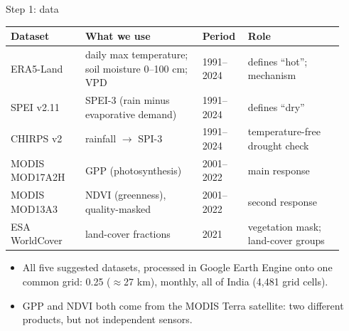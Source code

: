 \documentclass[11pt,aspectratio=169]{beamer}
\begin{document}
\begin{frame}{Step 1: data}
  \scriptsize
  \renewcommand{\arraystretch}{0.95}
  \begin{tabular}{@{}L{0.21\linewidth}L{0.33\linewidth}L{0.12\linewidth}L{0.27\linewidth}@{}}
    \toprule
    \textbf{Dataset} & \textbf{What we use} & \textbf{Period} & \textbf{Role} \\
    \midrule
    ERA5-Land \citep{munozsabater2021} & daily max temperature; soil moisture 0--100 cm; VPD & 1991--2024 & defines ``hot''; mechanism \\
    SPEI v2.11 \citep{vicenteserrano2010} & SPEI-3 (rain minus evaporative demand) & 1991--2024 & defines ``dry'' \\
    CHIRPS v2 \citep{funk2015} & rainfall $\rightarrow$ SPI-3 & 1991--2024 & temperature-free drought check \\
    MODIS MOD17A2H \citep{running2015,running2004} & GPP (photosynthesis) & 2001--2022 & main response \\
    MODIS MOD13A3 \citep{didan2021} & NDVI (greenness), quality-masked & 2001--2022 & second response \\
    ESA WorldCover \citep{zanaga2022} & land-cover fractions & 2021 & vegetation mask; land-cover groups \\
    \bottomrule
  \end{tabular}

  \vspace{6pt}
  \begin{itemize}
    \item All five suggested datasets, processed in Google Earth Engine
      \citep{gorelick2017} onto one common grid: 0.25\textdegree{} ($\approx$27 km),
      monthly, all of India (4,481 grid cells).
    \item GPP and NDVI both come from the MODIS Terra satellite: two
      different products, but not independent sensors.
  \end{itemize}
\end{frame}
\end{document}
